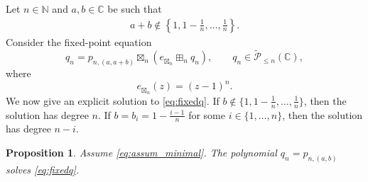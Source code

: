 \documentclass[a4paper,11pt]{amsart}
\numberwithin{equation}{section}
\newtheorem{proposition}[theorem]{Proposition}
\newcommand{\C}{\mathbb{C}}
\newcommand{\N}{\mathbb{N}}
\newcommand{\pols}{\mathcal P}
\begin{document}
Let $n\in\N$  and $a,b\in\C$ be such that
\begin{align}\label{eq:assum_minimal}
a+b\notin\left\{1,1-\frac1n,\ldots,\frac1n\right\}.
\end{align}
Consider the fixed-point equation
\begin{equation}\label{eq:fixedq}
q_n
=
p_{n,(a,a+b)}\boxtimes_n (e_{\boxtimes_n} \boxplus_n q_n),
\qquad q_n\in\tilde{\pols}_{\le n}(\C),
\end{equation}
where
\[
e_{\boxtimes_n}(z)=(z-1)^n.
\]
We now give an explicit solution to \eqref{eq:fixedq}. If \(b\notin\{1,1-\frac1n,\ldots,\frac1n\}\), then the solution has degree \(n\).
If \(b=b_i=1-\frac{i-1}{n}\) for some \(i\in\{1,\ldots,n\}\), then the solution has degree \(n-i\).

\begin{proposition}\label{prop:pff_shift_factorization}
Assume \eqref{eq:assum_minimal}.
The polynomial \(q_n=p_{n,(a,b)}\) solves
\eqref{eq:fixedq}.
\end{proposition}
\end{document}
